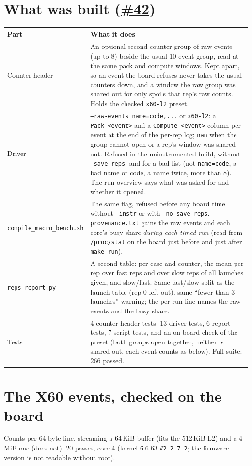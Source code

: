 \documentclass[10pt,a4paper]{article}
\newcommand{\iss}[1]{\href{https://github.com/JieGH/RVV_code_gen_via_MLIR_xDSL/issues/#1}{\##1}}
\begin{document}
\section{What was built (\iss{42})}
\begin{tabularx}{\linewidth}{@{}>{\raggedright\arraybackslash}p{4.1cm}X@{}}
\toprule
Part & What it does \\
\midrule
Counter header & An optional second counter group of raw events (up to 8) beside the usual 10-event group, read
at the same pack and compute windows. Kept apart, so an event the board refuses never takes the usual counters down,
and a window the raw group was shared out for only spoils that rep's raw counts. Holds the checked
\texttt{x60-l2} preset. \\
Driver & \texttt{--raw-events name=code,...} or \texttt{x60-l2}: a \texttt{Pack\_<event>} and a
\texttt{Compute\_<event>} column per event at the end of the per-rep log; \texttt{nan} when the group cannot open
or a rep's window was shared out. Refused in the uninstrumented build, without \texttt{--save-reps}, and for a bad
list (not \texttt{name=code}, a bad name or code, a name twice, more than 8). The run overview says what was asked
for and whether it opened. \\
\texttt{compile\_macro\_bench.sh} & The same flag, refused before any board time without \texttt{--instr} or with
\texttt{--no-save-reps}. \texttt{provenance.txt} gains the raw events and each core's busy share \emph{during each
timed run} (read from \texttt{/proc/stat} on the board just before and just after \texttt{make run}). \\
\texttt{reps\_report.py} & A second table: per case and counter, the mean per rep over fast reps and over slow
reps of all launches given, and slow/fast. Same fast/slow split as the launch table (rep 0 left out), same
``fewer than 3 launches'' warning; the per-run line names the raw events and the busy share. \\
Tests & 4 counter-header tests, 13 driver tests, 6 report tests, 7 script tests, and an on-board check of the
preset (both groups open together, neither is shared out, each event counts as below). Full suite: 266 passed. \\
\bottomrule
\end{tabularx}

\section{The X60 events, checked on the board}
Counts per 64-byte line, streaming a 64\,KiB buffer (fits the 512\,KiB L2) and a 4\,MiB one (does not), 20
passes, core 4 (kernel 6.6.63 \texttt{\#2.2.7.2}; the firmware version is not readable without root).
\end{document}
